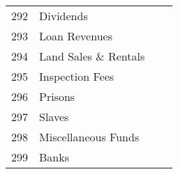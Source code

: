 \begin{tabular}{@{}rr|r|r|@{}}
\multicolumn{1}{|l|}{292}           & \multicolumn{1}{l|}{Dividends}                                     & \multicolumn{1}{l|}{}              & \multicolumn{1}{l|}{}                                                              \\
\multicolumn{1}{|l|}{293}           & \multicolumn{1}{l|}{Loan Revenues}                                 & \multicolumn{1}{l|}{}              & \multicolumn{1}{l|}{}                                                              \\
\multicolumn{1}{|l|}{294}           & \multicolumn{1}{l|}{Land Sales \& Rentals}                         & \multicolumn{1}{l|}{}              & \multicolumn{1}{l|}{}                                                              \\
\multicolumn{1}{|l|}{295}           & \multicolumn{1}{l|}{Inspection Fees}                               & \multicolumn{1}{l|}{}              & \multicolumn{1}{l|}{}                                                              \\
\multicolumn{1}{|l|}{296}           & \multicolumn{1}{l|}{Prisons}                                       & \multicolumn{1}{l|}{}              & \multicolumn{1}{l|}{}                                                              \\
\multicolumn{1}{|l|}{297}           & \multicolumn{1}{l|}{Slaves}                                        & \multicolumn{1}{l|}{}              & \multicolumn{1}{l|}{}                                                              \\
\multicolumn{1}{|l|}{298}           & \multicolumn{1}{l|}{Miscellaneous Funds}                           & \multicolumn{1}{l|}{}              & \multicolumn{1}{l|}{}                                                              \\
\multicolumn{1}{|l|}{299}           & \multicolumn{1}{l|}{Banks}                                         & \multicolumn{1}{l|}{}              & \multicolumn{1}{l|}{}                                                             
\end{tabular}